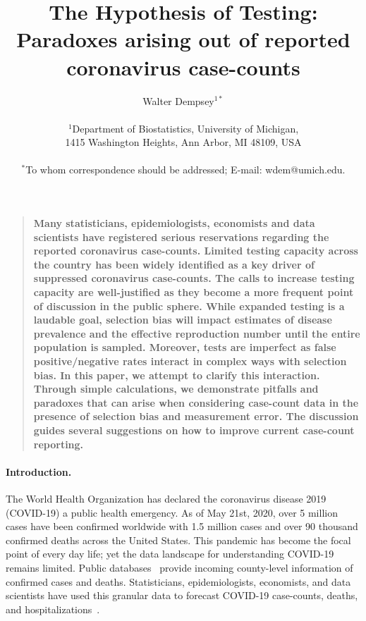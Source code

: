 \documentclass[12pt]{article}
\title{The Hypothesis of Testing: Paradoxes arising out of reported coronavirus case-counts}
\author
{Walter Dempsey$^{1\ast}$\\
\\
\normalsize{$^{1}$Department of Biostatistics, University of Michigan,}\\
\normalsize{1415 Washington Heights, Ann Arbor, MI 48109, USA}\\
\\
\normalsize{$^\ast$To whom correspondence should be addressed; E-mail:  wdem@umich.edu.}
}
\date{}
\newenvironment{sciabstract}{%
\begin{quote} \bf}
{\end{quote}}
\begin{document}

\baselineskip24pt


\maketitle


\begin{sciabstract}
  Many statisticians, epidemiologists, economists and data scientists have registered serious reservations regarding the reported coronavirus case-counts. Limited testing capacity across the country has been widely identified as a key driver of suppressed coronavirus case-counts.  The calls to increase testing capacity are well-justified as they become a more frequent point of discussion in the public sphere.  While expanded testing is a laudable goal, selection bias will impact estimates of disease prevalence and the effective reproduction number until the entire population is sampled.  Moreover, tests are imperfect as false positive/negative rates interact in complex ways with selection bias.  In this paper, we attempt to clarify this interaction.  Through simple calculations, we demonstrate pitfalls and paradoxes that can arise when considering case-count data in the presence of selection bias and measurement error. The discussion guides several suggestions on how to improve current case-count reporting.
\end{sciabstract}

\paragraph*{Introduction.}

The World Health Organization has declared the coronavirus disease 2019 (COVID-19) a public health emergency.  As of May 21st, 2020, over 5 million cases have been confirmed worldwide with 1.5 million cases and over 90 thousand confirmed deaths across the United States. This pandemic
has become the focal point of every day life; yet the data landscape for understanding COVID-19 remains limited.  Public databases~\cite{JHU_Lancet,NYT} provide incoming county-level information of confirmed cases and deaths.  Statisticians, epidemiologists, economists, and data scientists have used this granular data to forecast COVID-19 case-counts, deaths, and hospitalizations~\cite{Giordano2020,Song2020,Ray2020,2020.IHME,Wang2020.03,JTD36385}.
\end{document}
